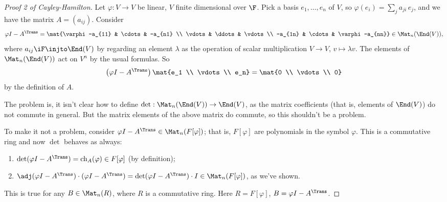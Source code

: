 \begin{proof}
	[Proof 2 of Cayley-Hamilton] Let $\varphi:V\to V$ be linear, $V$  finite dimensional over $\F$. Pick a basis $e_1,\ldots,e_n$ of $V$, so $\varphi(e_i) = \sum_j a_{ji}\,e_j$, and we have the matrix $A=(a_{ij})$. Consider %
	\begin{equation*}
		\varphi I - A^\Trans =
		\mat{\varphi-a_{11} & \cdots & -a_{n1} \\ \vdots & \ddots & \vdots \\ -a_{1n} & \cdots & \varphi-a_{nn}} \in {\Mat}_n(\End(V)), %
	\end{equation*}
	where $a_{ij}\iF \injto \End(V)$ by regarding an element $\lambda$ as the operation of scalar multiplication $V \to V$, $v \mapsto \lambda v$.
The elements of $\Mat_n(\End(V))$ act on $V^n$ by the usual formulas. So %
	\begin{equation*}
		\left( \varphi I-A^\Trans \right)
		\mat{e_1 \\ \vdots \\ e_n}
		=
		\mat{0 \\ \vdots \\ 0}
	\end{equation*}
	by the definition of $A$.
	
	The problem is, it isn't clear how to define $\det:\Mat_n(\End(V)) \to \End(V)$, as the matrix coefficients (that is, elements of $\End(V)$) do not commute in general. But the matrix elements of the above matrix do commute, so this shouldn't be a problem. %
	
	To make it not a problem, consider $\varphi I-A^\Trans\in\Mat_n(F[\varphi])$; that is, $F[\varphi]$ are polynomials in the symbol $\varphi$. This is a commutative ring and now $\det$ behaves as always:%
	\begin{enumerate}
		\shortskip
		\item $\det(\varphi I-A^\Trans) = \chi_A(\varphi)\in F[\varphi]$ (by definition); %
		\item $\adj(\varphi I-A^\Trans) \cdot (\varphi I-A^\Trans) = \det(\varphi I - A^\Trans) \cdot I \in \Mat_n(F[\varphi])$, as we've shown. %
	\end{enumerate}
	This is true for any $B\in\Mat_n(R)$, where $R$ is a commutative ring.  Here $R=F[\varphi]$, $B=\varphi I-A^\Trans$.
	

\end{proof}
